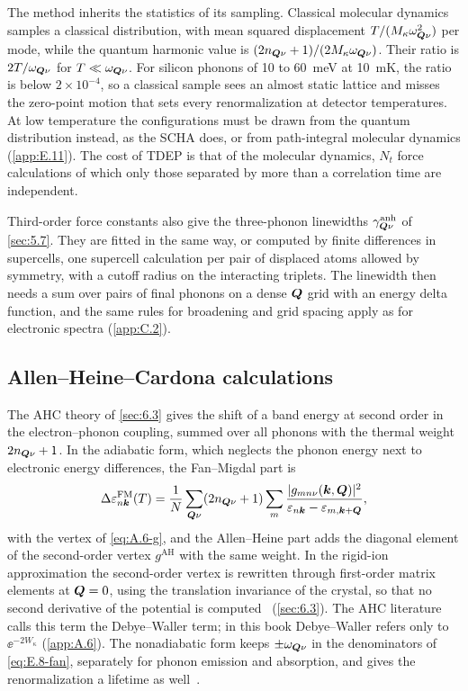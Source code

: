 The method inherits the statistics of its sampling. Classical molecular dynamics samples a classical distribution, with mean squared displacement $T/(M_\kappa\omega_{\bm{Q}\nu}^2)$ per mode, while the quantum harmonic value is $(2n_{\bm{Q}\nu} + 1)/(2M_\kappa\omega_{\bm{Q}\nu})$. Their ratio is $2T/\omega_{\bm{Q}\nu}$ for $T \ll \omega_{\bm{Q}\nu}$. For silicon phonons of 10 to \SI{60}{meV} at \SI{10}{mK}, the ratio is below $2\times10^{-4}$, so a classical sample sees an almost static lattice and misses the zero-point motion that sets every renormalization at detector temperatures. At low temperature the configurations must be drawn from the quantum distribution instead, as the SCHA does, or from path-integral molecular dynamics (\cref{app:E.11}). The cost of TDEP is that of the molecular dynamics, $N_t$ force calculations of which only those separated by more than a correlation time are independent.

Third-order force constants also give the three-phonon linewidths $\gamma^{\mathrm{anh}}_{\bm{Q}\nu}$ of \cref{sec:5.7}. They are fitted in the same way, or computed by finite differences in supercells, one supercell calculation per pair of displaced atoms allowed by symmetry, with a cutoff radius on the interacting triplets. The linewidth then needs a sum over pairs of final phonons on a dense $\bm{Q}$ grid with an energy delta function, and the same rules for broadening and grid spacing apply as for electronic spectra (\cref{app:C.2}).

\subsection{Allen--Heine--Cardona calculations}

The AHC theory of \cref{sec:6.3} gives the shift of a band energy at second order in the electron--phonon coupling, summed over all phonons with the thermal weight $2n_{\bm{Q}\nu} + 1$. In the adiabatic form, which neglects the phonon energy next to electronic energy differences, the Fan--Migdal part is
\begin{equation}
  \Delta\varepsilon^{\mathrm{FM}}_{n\bm{k}}(T) = \frac{1}{N}\sum_{\bm{Q}\nu}(2n_{\bm{Q}\nu} + 1)\sum_m\frac{|g_{mn\nu}(\bm{k},\bm{Q})|^2}{\varepsilon_{n\bm{k}} - \varepsilon_{m,\bm{k}+\bm{Q}}} ,
  \label{eq:E.8-fan}
\end{equation}
with the vertex of \cref{eq:A.6-g}, and the Allen--Heine part adds the diagonal element of the second-order vertex $g^{\mathrm{AH}}$ with the same weight. In the rigid-ion approximation the second-order vertex is rewritten through first-order matrix elements at $\bm{Q} = 0$, using the translation invariance of the crystal, so that no second derivative of the potential is computed~\cite[Eqs.~(11) and~(15)]{ponce2015temperature} (\cref{sec:6.3}). The AHC literature calls this term the Debye--Waller term; in this book Debye--Waller refers only to $\ee^{-2W_\kappa}$ (\cref{app:A.6}). The nonadiabatic form keeps $\pm\omega_{\bm{Q}\nu}$ in the denominators of \cref{eq:E.8-fan}, separately for phonon emission and absorption, and gives the renormalization a lifetime as well~\cite[Eq.~(16)]{ponce2015temperature}.

